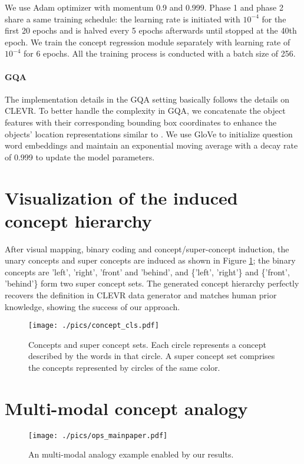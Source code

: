 \documentclass[10pt,twocolumn,letterpaper]{article}
\begin{document}
We use Adam optimizer \cite{kingma2014adam} with momentum 0.9 and 0.999. Phase 1 and phase 2 share a same training schedule: the learning rate is initiated with $10^{-4}$ for the first 20 epochs and is halved every 5 epochs afterwards until stopped at the 40th epoch. We train the concept regression module separately with learning rate of $10^{-4}$ for 6 epochs. All the training process is conducted with a batch size of 256.

\paragraph{GQA}
The implementation details in the GQA setting basically follows the details on CLEVR.
To better handle the complexity in GQA,
we concatenate the object features with their corresponding bounding box coordinates to enhance the objects' location representations similar to \cite{hu2019language}. We use GloVe \cite{pennington2014glove} to initialize question word embeddings and maintain an exponential moving average with a decay rate of 0.999 to update the model parameters.


\section{Visualization of the induced concept hierarchy}
\label{app:concept_correlation}
After visual mapping, binary coding and concept/super-concept induction, the unary concepts and super concepts are induced as shown in Figure \ref{conc_cls}; the binary concepts are 'left', 'right', 'front' and 'behind', and \{'left', 'right'\} and \{'front', 'behind'\} form two super concept sets.
The generated concept hierarchy perfectly recovers the definition in CLEVR data generator and matches human prior knowledge, showing the success of our approach.



\begin{figure}
\centering
\texttt{[image: ./pics/concept\_cls.pdf]}
\caption{Concepts and super concept sets. Each circle represents a concept described by the words in that circle. A super concept set comprises the concepts represented by circles of the same color.}
\label{conc_cls}
\vspace{-3mm}
\end{figure}



\section{Multi-modal concept analogy}
\label{app:concept_analogy}
\begin{figure}[t]
\centering
\texttt{[image: ./pics/ops\_mainpaper.pdf]}
\caption{An multi-modal analogy example enabled by our results.}
\label{ops_main}
\vspace{-1mm}
\end{figure}
\end{document}
